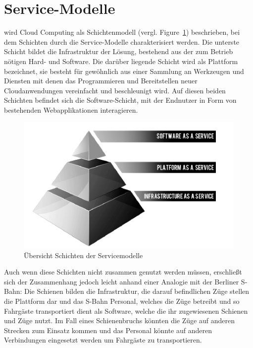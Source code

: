 \section{Service-Modelle}
\label{sec_service_models}

 wird Cloud Computing als Schichtenmodell (vergl. Figure~\ref{fig:serviceModels}) beschrieben, bei dem Schichten durch die Service-Modelle charakterisiert werden. Die unterste Schicht bildet die Infrastruktur der Lösung, bestehend aus der zum Betrieb nötigen Hard- und Software. Die darüber liegende Schicht wird als Plattform bezeichnet, sie besteht für gewöhnlich aus einer Sammlung an Werkzeugen und Diensten mit denen das Programmieren und Bereitstellen neuer Cloudanwendungen vereinfacht und beschleunigt wird. Auf diesen beiden Schichten befindet sich die Software-Schicht, mit der Endnutzer in Form von bestehenden Webapplikationen interagieren. \cite{rackSpace}

\begin{figure}
	\centering
	\includegraphics[width=0.95\linewidth]{images/cloudcomputestackimage1}
	\caption{Übersicht Schichten der Servicemodelle}
	\label{fig:serviceModels}
\end{figure}

Auch wenn diese Schichten nicht zusammen genutzt werden müssen, erschließt sich der Zusammenhang jedoch leicht anhand einer Analogie mit der Berliner S-Bahn: Die Schienen bilden die Infrastruktur, die darauf befindlichen Züge stellen die Plattform dar und das S-Bahn Personal, welches die Züge betreibt und so Fahrgäste transportiert dient als Software, welche die ihr zugewiesenen Schienen und Züge nutzt. Im Fall eines Schienenbruchs könnten die Züge auf anderen Strecken zum Einsatz kommen und das Personal könnte auf anderen Verbindungen eingesetzt werden um Fahrgäste zu transportieren.

